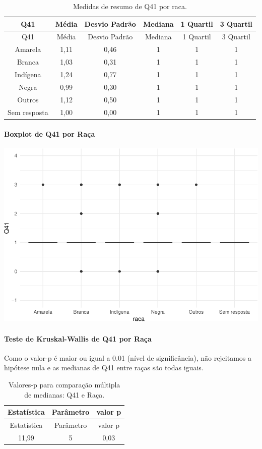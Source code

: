 \documentclass[]{article}
\let\oldparagraph\paragraph
\renewcommand{\paragraph}[1]{\oldparagraph{#1}\mbox{}}
\begin{document}
\begin{longtable}[]{@{}cccccc@{}}
\caption{\label{tab:unnamed-chunk-1640}Medidas de resumo de Q41 por raca.}\tabularnewline
\toprule
Q41 & Média & Desvio Padrão & Mediana & 1 Quartil & 3 Quartil\tabularnewline
\midrule
\endfirsthead
\toprule
Q41 & Média & Desvio Padrão & Mediana & 1 Quartil & 3 Quartil\tabularnewline
\midrule
\endhead
Amarela & 1,11 & 0,46 & 1 & 1 & 1\tabularnewline
Branca & 1,03 & 0,31 & 1 & 1 & 1\tabularnewline
Indígena & 1,24 & 0,77 & 1 & 1 & 1\tabularnewline
Negra & 0,99 & 0,30 & 1 & 1 & 1\tabularnewline
Outros & 1,12 & 0,50 & 1 & 1 & 1\tabularnewline
Sem resposta & 1,00 & 0,00 & 1 & 1 & 1\tabularnewline
\bottomrule
\end{longtable}

\hypertarget{boxplot-de-q41-por-rauxe7a}{%
\paragraph{Boxplot de Q41 por Raça}\label{boxplot-de-q41-por-rauxe7a}}

\begin{center}\includegraphics[width=0.75\linewidth]{relatorio_covid19_files/figure-latex/unnamed-chunk-1641-1} \end{center}

\hypertarget{teste-de-kruskal-wallis-de-q41-por-rauxe7a}{%
\paragraph{Teste de Kruskal-Wallis de Q41 por Raça}\label{teste-de-kruskal-wallis-de-q41-por-rauxe7a}}

Como o valor-p é maior ou igual a 0.01 (nível de significância), não rejeitamos a hipótese nula e as medianas de Q41 entre raças são todas iguais.

\begin{longtable}[]{@{}ccc@{}}
\caption{\label{tab:unnamed-chunk-1643}Valores-p para comparação múltipla de medianas: Q41 e Raça.}\tabularnewline
\toprule
Estatística & Parâmetro & valor p\tabularnewline
\midrule
\endfirsthead
\toprule
Estatística & Parâmetro & valor p\tabularnewline
\midrule
\endhead
11,99 & 5 & 0,03\tabularnewline
\bottomrule
\end{longtable}
\end{document}
